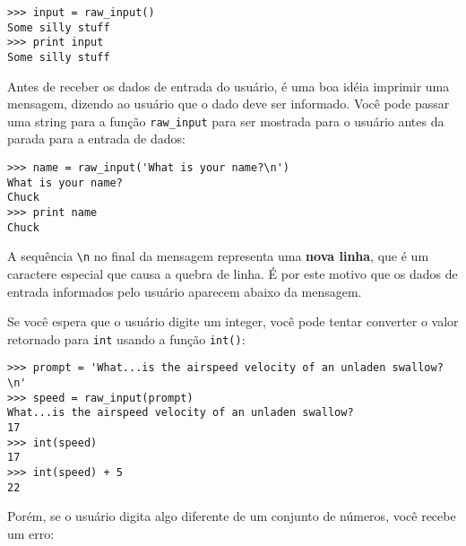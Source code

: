 {{{{{{{{{{{{{{{{

\beforeverb
\begin{verbatim}
>>> input = raw_input()
Some silly stuff
>>> print input
Some silly stuff
\end{verbatim}
\afterverb
%

Antes de receber os dados de entrada do usuário, é uma boa idéia imprimir uma 
mensagem, dizendo ao usuário que o dado deve ser informado. Você pode passar uma string 
para a função \verb"raw_input" para ser mostrada para o usuário antes da parada 
para a entrada de dados:


\beforeverb
\begin{verbatim}
>>> name = raw_input('What is your name?\n')
What is your name?
Chuck
>>> print name
Chuck
\end{verbatim}
\afterverb
%

A sequência \verb"\n" no final da mensagem representa uma {\bf nova linha},
que é um caractere especial que causa a quebra de linha. 
É por este motivo que os dados de entrada informados pelo usuário aparecem 
abaixo da mensagem.


Se você espera que o usuário digite um integer, você pode tentar converter 
o valor retornado para {\tt int} usando a função {\tt int()}: 

\beforeverb
\begin{verbatim}
>>> prompt = 'What...is the airspeed velocity of an unladen swallow?\n'
>>> speed = raw_input(prompt)
What...is the airspeed velocity of an unladen swallow?
17
>>> int(speed)
17
>>> int(speed) + 5
22
\end{verbatim}
\afterverb
%

Porém, se o usuário digita algo diferente de um conjunto de números, 
você recebe um erro:

}}}}}}}}}}}}}}}}
